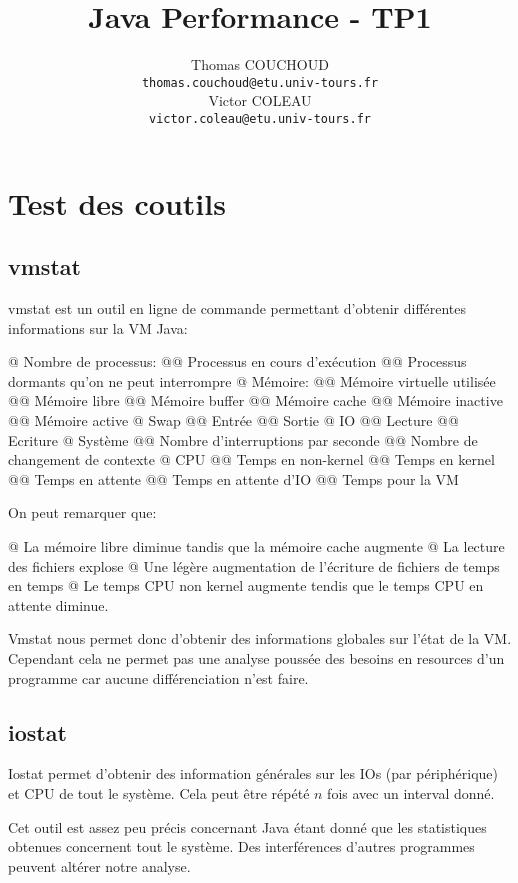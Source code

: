 \documentclass{report}
\title{Java Performance - TP1}
\author{Thomas COUCHOUD\\\texttt{thomas.couchoud@etu.univ-tours.fr}\\Victor COLEAU\\\texttt{victor.coleau@etu.univ-tours.fr}}
\begin{document}
	\mccTitle
	
	\chapter{Test des coutils}
		\section{vmstat}
			vmstat est un outil en ligne de commande permettant d'obtenir différentes informations sur la VM Java:
			\begin{easylist}[itemize]
				@ Nombre de processus:
				@@ Processus en cours d'exécution
				@@ Processus dormants qu'on ne peut interrompre
				@ Mémoire:
				@@ Mémoire virtuelle utilisée
				@@ Mémoire libre
				@@ Mémoire buffer
				@@ Mémoire cache
				@@ Mémoire inactive
				@@ Mémoire active
				@ Swap
				@@ Entrée
				@@ Sortie
				@ IO
				@@ Lecture
				@@ Ecriture
				@ Système
				@@ Nombre d'interruptions par seconde
				@@ Nombre de changement de contexte
				@ CPU
				@@ Temps en non-kernel
				@@ Temps en kernel
				@@ Temps en attente
				@@ Temps en attente d'IO
				@@ Temps pour la VM
			\end{easylist}
			
			
			On peut remarquer que:
			\begin{easylist}[itemize]
				@ La mémoire libre diminue tandis que la mémoire cache augmente
				@ La lecture des fichiers explose
				@ Une légère augmentation de l'écriture de fichiers de temps en temps
				@ Le temps CPU non kernel augmente tendis que le temps CPU en attente diminue.	
			\end{easylist}

			Vmstat nous permet donc d'obtenir des informations globales sur l'état de la VM.
			Cependant cela ne permet pas une analyse poussée des besoins en resources d'un programme car aucune différenciation n'est faire.
			
		\section{iostat}
			Iostat permet d'obtenir des information générales sur les IOs (par périphérique) et CPU de tout le système.
			Cela peut être répété $n$ fois avec un interval donné.
			
			
			Cet outil est assez peu précis concernant Java étant donné que les statistiques obtenues concernent tout le système.
			Des interférences d'autres programmes peuvent altérer notre analyse.
			
\end{document}

